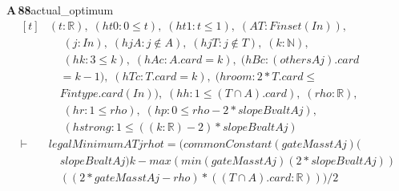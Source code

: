 \documentclass[conference]{IEEEtran}
\theoremstyle{definition}
\newcommand{\lean}[1]{\textsf{\footnotesize #1}}
\begin{document}
\noindent\textbf{A\,88}\quad\lean{actual\_optimum}
{\footnotesize\[ \begin{aligned}[t]
&(\mathit{t} : \mathbb{R} ),\; (\mathit{ht0} : 0 \leq \mathit{t}),\; (\mathit{ht1} : \mathit{t} \leq 1),\; (\mathit{A} \mathit{T} : \mathit{Finset} (\mathit{I} \mathit{n})),\\
&\quad \; (\mathit{j} : \mathit{I} \mathit{n}),\; (\mathit{hjA} : \mathit{j} \notin \mathit{A}),\; (\mathit{hjT} : \mathit{j} \notin \mathit{T}),\; (\mathit{k} : \mathbb{N} ),\\
&\quad \; (\mathit{hk} : 3 \leq \mathit{k}),\; (\mathit{hAc} : \mathit{A}.\mathit{card}=\mathit{k}),\; (\mathit{hBc} : (\mathit{others} \mathit{A} \mathit{j}).\mathit{card}\\
&\quad =\mathit{k}-1),\; (\mathit{hTc} : \mathit{T}.\mathit{card}=\mathit{k}),\; (\mathit{hroom} : 2*\mathit{T}.\mathit{card} \leq\\
&\quad \mathit{Fintype}.\mathit{card} (\mathit{I} \mathit{n})),\; (\mathit{hh} : 1 \leq (\mathit{T} \cap \mathit{A}).\mathit{card}),\; (\mathit{rho} : \mathbb{R} ),\\
&\quad \; (\mathit{hr} : 1 \leq \mathit{rho}),\; (\mathit{hp} : 0 \leq \mathit{rho}-2*\mathit{slopeBval} \mathit{t} \mathit{A} \mathit{j}),\\
&\quad \; (\mathit{hstrong} : 1 \leq ((\mathit{k}:\mathbb{R} )-2)*\mathit{slopeBval} \mathit{t} \mathit{A} \mathit{j})\\
\vdash\;&\mathit{legalMinimum} \mathit{A} \mathit{T} \mathit{j} \mathit{rho} \mathit{t} = (\mathit{commonConstant} (\mathit{gateMass} \mathit{t} \mathit{A} \mathit{j}) (\\
&\quad \mathit{slopeBval} \mathit{t} \mathit{A} \mathit{j}) \mathit{k}- \mathit{max} (\mathit{min} (\mathit{gateMass} \mathit{t} \mathit{A} \mathit{j}) (2*\mathit{slopeBval} \mathit{t} \mathit{A} \mathit{j}))\\
&\quad ((2*\mathit{gateMass} \mathit{t} \mathit{A} \mathit{j}-\mathit{rho})*((\mathit{T} \cap \mathit{A}).\mathit{card}:\mathbb{R} )))/2
\end{aligned} \]}
\end{document}
